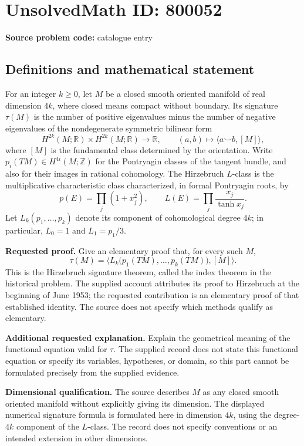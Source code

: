 \documentclass[11pt]{article}
\newcommand{\Z}{\mathbb{Z}}
\newcommand{\R}{\mathbb{R}}
\begin{document}
\section*{UnsolvedMath ID: 800052}
\textbf{Source problem code:} catalogue entry
\subsection{Definitions and mathematical statement}
For an integer \(k\geq 0\), let \(M\) be a closed smooth oriented manifold of real dimension \(4k\), where closed means compact without boundary. Its signature \(\tau(M)\) is the number of positive eigenvalues minus the number of negative eigenvalues of the nondegenerate symmetric bilinear form
\[
H^{2k}(M;\R)\times H^{2k}(M;\R)\longrightarrow\R,
\qquad (a,b)\longmapsto\langle a\smile b,[M]\rangle,
\]
where \([M]\) is the fundamental class determined by the orientation. Write \(p_i(TM)\in H^{4i}(M;\Z)\) for the Pontryagin classes of the tangent bundle, and also for their images in rational cohomology. The Hirzebruch \(L\)-class is the multiplicative characteristic class characterized, in formal Pontryagin roots, by
\[
p(E)=\prod_j(1+x_j^2),\qquad
L(E)=\prod_j\frac{x_j}{\tanh x_j}.
\]
Let \(L_k(p_1,\ldots,p_k)\) denote its component of cohomological degree \(4k\); in particular, \(L_0=1\) and \(L_1=p_1/3\).

\textbf{Requested proof.} Give an elementary proof that, for every such \(M\),
\[
\tau(M)=\bigl\langle L_k\bigl(p_1(TM),\ldots,p_k(TM)\bigr),[M]\bigr\rangle.
\]
This is the Hirzebruch signature theorem, called the index theorem in the historical problem. The supplied account attributes its proof to Hirzebruch at the beginning of June 1953; the requested contribution is an elementary proof of that established identity. The source does not specify which methods qualify as elementary.

\textbf{Additional requested explanation.} Explain the geometrical meaning of the functional equation valid for \(\tau\). The supplied record does not state this functional equation or specify its variables, hypotheses, or domain, so this part cannot be formulated precisely from the supplied evidence.

\textbf{Dimensional qualification.} The source describes \(M\) as any closed smooth oriented manifold without explicitly giving its dimension. The displayed numerical signature formula is formulated here in dimension \(4k\), using the degree-\(4k\) component of the \(L\)-class. The record does not specify conventions or an intended extension in other dimensions.
\end{document}
